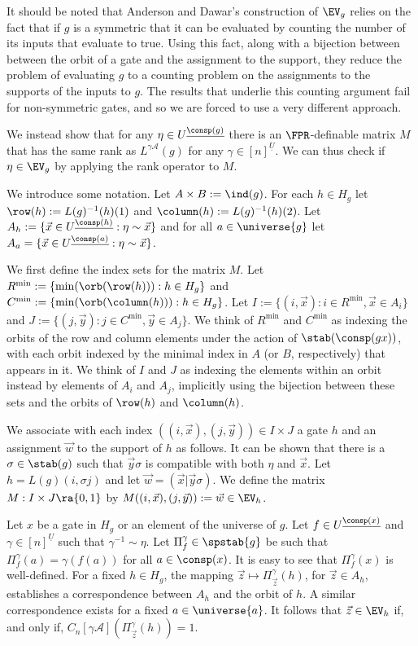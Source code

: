 \documentclass[a4paper,UKenglish]{lipics-v2018}
\begin{document}
It should be noted that Anderson and Dawar's construction of $\EV_g$ relies on
the fact that if $g$ is a symmetric that it can be evaluated by counting the
number of its inputs that evaluate to true. Using this fact, along with a
bijection between between the orbit of a gate and the assignment to the support,
they reduce the problem of evaluating $g$ to a counting problem on the
assignments to the supports of the inputs to $g$. The results that underlie this
counting argument fail for non-symmetric gates, and so we are forced to use a
very different approach.

We instead show that for any $\eta \in U^{\underline{\consp(g)}}$ there is an
$\FPR$-definable matrix $M$ that has the same rank as $L^{\gamma
  \mathcal{A}}(g)$ for any $\gamma \in [n]^{\underline{U}}$. We can thus check
if $\eta \in \EV_g$ by applying the rank operator to $M$.

We introduce some notation. Let $A \times B := \ind(g)$. For each $h \in H_g$
let $\row(h) := L(g)^{-1}(h)(1)$ and $\column(h) := L(g)^{-1}(h)(2)$. Let $A_h
:= \{ \vec{x} \in U^{\underline{\consp(h)}} : \eta \sim \vec{x} \}$ and for all
$a \in \universe{g}$ let $A_a = \{\vec{x} \in U^{\underline{\consp(a)}} : \eta
\sim \vec{x}\}$.

We first define the index sets for the matrix $M$. Let $R^{\min} := \{\min
(\orb(\row(h))) : h \in H_g\}$ and $C^{\min} := \{ \min (\orb (\column(h))) : h
\in H_g\}$. Let $I := \{(i, \vec{x}): i \in R^{\min}, \vec{x} \in A_i\}$ and $J
:= \{(j, \vec{y}): j \in C^{\min}, \vec{y} \in A_j\}$. We think of $R^{\min}$
and $C^{\min}$ as indexing the orbits of the row and column elements under the
action of $\stab(\consp(gx))$, with each orbit indexed by the minimal index in
$A$ (or $B$, respectively) that appears in it. We think of $I$ and $J$ as
indexing the elements within an orbit instead by elements of $A_i$ and $A_j$,
implicitly using the bijection between these sets and the orbits of $\row(h)$
and $\column(h)$.

We associate with each index $((i, \vec{x}), (j, \vec{y})) \in I \times J$ a
gate $h$ and an assignment $\vec{w}$ to the support of $h$ as follows. It can be
shown that there is a $\sigma \in \stab(g)$ such that $\vec{y} \sigma$ is
compatible with both $\eta$ and $\vec{x}$. Let $h = L(g)(i, \sigma j)$ and let
$\vec{w} = (\vec{x} \vert \vec{y} \sigma)$. We define the matrix $M : I \times J
\ra \{0,1\}$ by $M((i , \vec{x}), (j, \vec{y})) := \vec{w} \in \EV_h$.

Let $x$ be a gate in $H_g$ or an element of the universe of $g$. Let $f \in
U^{\underline{\consp(x)}}$ and $\gamma \in [n]^{\underline{U}}$ such that
$\gamma^{-1} \sim \eta$. Let $\Pi^{\gamma}_{f} \in \spstab{g}$ be such that
$\Pi^{\gamma}_f (a) = \gamma (f(a))$ for all $a \in \consp(x)$. It is easy to
see that $\Pi^{\gamma}_f(x)$ is well-defined. For a fixed $h \in H_g$, the
mapping $\vec{z} \mapsto \Pi^{\gamma}_{\vec{z}}(h)$, for $\vec{z} \in A_h$,
establishes a correspondence between $A_h$ and the orbit of $h$. A similar
correspondence exists for a fixed $a \in \universe{a}$. It follows that $\vec{z}
\in \EV_h$ if, and only if, $C_n[\gamma \mathcal{A}](\Pi^{\gamma}_{\vec{z}}(h))
= 1$.
\end{document}
